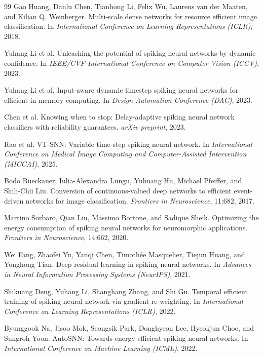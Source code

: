 \documentclass[11pt]{article}
\begin{document}
\begin{table}[t]
\begin{thebibliography}{99}
Gao Huang, Danlu Chen, Tianhong Li, Felix Wu, Laurens van der Maaten, and Kilian Q. Weinberger.
\newblock Multi-scale dense networks for resource efficient image classification.
\newblock In \emph{International Conference on Learning Representations (ICLR)}, 2018.

Yuhang Li et al.
\newblock Unleashing the potential of spiking neural networks by dynamic confidence.
\newblock In \emph{IEEE/CVF International Conference on Computer Vision (ICCV)}, 2023.

Yuhang Li et al.
\newblock Input-aware dynamic timestep spiking neural networks for efficient in-memory computing.
\newblock In \emph{Design Automation Conference (DAC)}, 2023.

Chen et al.
\newblock Knowing when to stop: Delay-adaptive spiking neural network classifiers with reliability guarantees.
\newblock \emph{arXiv preprint}, 2023.

Rao et al.
\newblock VT-SNN: Variable time-step spiking neural network.
\newblock In \emph{International Conference on Medical Image Computing and Computer-Assisted Intervention (MICCAI)}, 2025.

Bodo Rueckauer, Iulia-Alexandra Lungu, Yuhuang Hu, Michael Pfeiffer, and Shih-Chii Liu.
\newblock Conversion of continuous-valued deep networks to efficient event-driven networks for image classification.
\newblock \emph{Frontiers in Neuroscience}, 11:682, 2017.

Martino Sorbaro, Qian Liu, Massimo Bortone, and Sadique Sheik.
\newblock Optimizing the energy consumption of spiking neural networks for neuromorphic applications.
\newblock \emph{Frontiers in Neuroscience}, 14:662, 2020.

Wei Fang, Zhaofei Yu, Yanqi Chen, Timothée Masquelier, Tiejun Huang, and Yonghong Tian.
\newblock Deep residual learning in spiking neural networks.
\newblock In \emph{Advances in Neural Information Processing Systems (NeurIPS)}, 2021.

Shikuang Deng, Yuhang Li, Shanghang Zhang, and Shi Gu.
\newblock Temporal efficient training of spiking neural network via gradient re-weighting.
\newblock In \emph{International Conference on Learning Representations (ICLR)}, 2022.

Byunggook Na, Jisoo Mok, Seongsik Park, Donghyeon Lee, Hyeokjun Choe, and Sungroh Yoon.
\newblock AutoSNN: Towards energy-efficient spiking neural networks.
\newblock In \emph{International Conference on Machine Learning (ICML)}, 2022.


\end{thebibliography}
\end{table}
\end{document}
